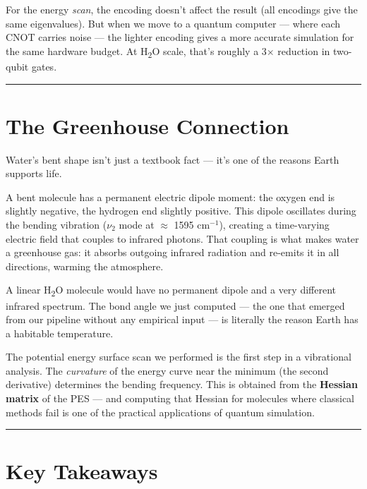 \documentclass[
  11pt,
  oneside]{book}
\begin{document}
For the energy \emph{scan}, the encoding doesn't affect the result (all
encodings give the same eigenvalues). But when we move to a quantum
computer --- where each CNOT carries noise --- the lighter encoding
gives a more accurate simulation for the same hardware budget. At H\textsubscript{2}O
scale, that's roughly a 3$\times$ reduction in two-qubit gates.

\begin{center}\rule{0.5\linewidth}{0.5pt}\end{center}

\section{The Greenhouse Connection}\label{the-greenhouse-connection}

Water's bent shape isn't just a textbook fact --- it's one of the
reasons Earth supports life.

A bent molecule has a permanent electric dipole moment: the oxygen end
is slightly negative, the hydrogen end slightly positive. This dipole
oscillates during the bending vibration (\(\nu_2\) mode at \(\approx\)
1595 cm\(^{-1}\)), creating a time-varying electric field that couples
to infrared photons. That coupling is what makes water a greenhouse gas:
it absorbs outgoing infrared radiation and re-emits it in all
directions, warming the atmosphere.

A linear H\textsubscript{2}O molecule would have no permanent dipole and a very
different infrared spectrum. The bond angle we just computed --- the one
that emerged from our pipeline without any empirical input --- is
literally the reason Earth has a habitable temperature.

The potential energy surface scan we performed is the first step in a
vibrational analysis. The \emph{curvature} of the energy curve near the
minimum (the second derivative) determines the bending frequency. This
is obtained from the \textbf{Hessian matrix} of the PES --- and
computing that Hessian for molecules where classical methods fail is one
of the practical applications of quantum simulation.

\begin{center}\rule{0.5\linewidth}{0.5pt}\end{center}

\section{Key Takeaways}\label{key-takeaways-18}
\end{document}
